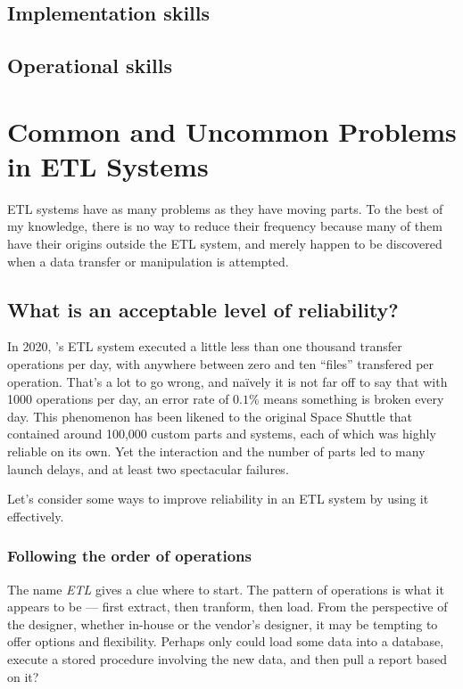 \documentclass[11pt,letterpaper,twosided]{memoir}
\begin{document}
\section{Implementation skills}

\section{Operational skills}

\chapter{Common and Uncommon Problems in ETL Systems}

ETL systems have as many problems as they have moving parts. To the
best of my knowledge, there is no way to reduce their frequency
because many of them have their origins outside the ETL system, and
merely happen to be discovered when a data transfer or manipulation
is attempted.

\section{What is an acceptable level of reliability?}

In 2020, \UR's ETL system executed a little less than one thousand
transfer operations per day, with anywhere between zero and ten
``files'' transfered per operation. That's a lot to go wrong, and
na{\"i}vely it is not far off to say that with 1000 operations per
day, an error rate of $0.1\%$ means something is broken every day.
This phenomenon has been likened to the original Space Shuttle that
contained around 100,000 custom parts and systems, each of which
was highly reliable on its own. Yet the interaction and the number
of parts led to many launch delays, and at least two spectacular
failures.

Let's consider some ways to improve reliability in an ETL system
by using it effectively.

\subsection{Following the order of operations}

The name \emph{ETL} gives a clue where to start. The pattern of 
operations is what it appears to be --- first extract, then tranform,
then load. From the perspective of the designer, whether in-house or
the vendor's designer, it may be tempting to offer options and
flexibility. Perhaps only could load some data into a database,
execute a stored procedure involving the new data, and then pull 
a report based on it?
\end{document}
